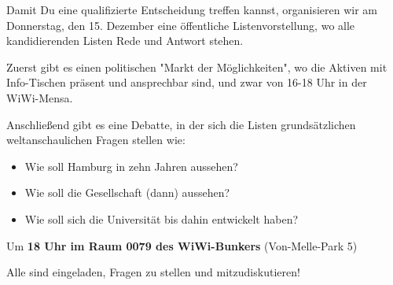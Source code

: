 \documentclass[a4paper,ngerman,headheight=80pt,10pt,DIV=calc]{scrartcl}
\begin{document}
    Damit Du eine qualifizierte Entscheidung treffen kannst, organisieren wir
    am Donnerstag, den 15. Dezember eine öffentliche Listenvorstellung, wo alle
    kandidierenden Listen Rede und Antwort stehen.

    Zuerst gibt es einen politischen "Markt der Möglichkeiten", wo die Aktiven
    mit Info-Tischen präsent und ansprechbar sind, und zwar von 16-18 Uhr in der
    WiWi-Mensa.

    Anschließend gibt es eine Debatte, in der sich die Listen grundsätzlichen
    weltanschaulichen Fragen stellen wie:

    \begin{itemize}
        \item Wie soll Hamburg in zehn Jahren aussehen?
        \item Wie soll die Gesellschaft (dann) aussehen?
        \item Wie soll sich die Universität bis dahin entwickelt haben?
    \end{itemize}

    Um \textbf{18 Uhr im Raum 0079 des WiWi-Bunkers} (Von-Melle-Park 5)

    Alle sind eingeladen, Fragen zu stellen und mitzudiskutieren!
\end{document}
